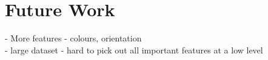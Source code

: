 \chapter{Future Work} \label{chap:future}
- More features - colours, orientation \\
- large dataset - hard to pick out all important features at a low level
